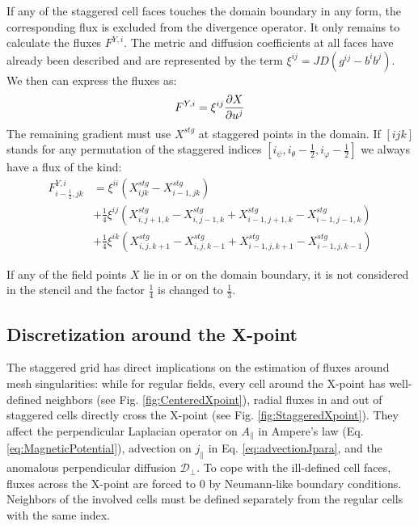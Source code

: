If any of the staggered cell faces touches the domain boundary in any form, the corresponding flux is excluded from the divergence operator. It only remains to calculate the fluxes $F^{Y,i}$. The metric and diffusion coefficients at all faces have already been described and are represented by the term $\xi^{ij}=JD(g^{ij}-b^ib^j)$. We then can express the fluxes as: 
$$ F^{Y,i} = \xi^{ij}\pdv{X}{u^j} $$
The remaining gradient must use $X^{stg}$ at staggered points in the domain. If $[ijk]$ stands for any permutation of the staggered indices $[i_\psi,i_\theta-\frac{1}{2},i_\varphi-\frac{1}{2}]$ we always have a flux of the kind:
\begin{align*}
	F^{Y,i}_{i-\frac{1}{2},jk} &= \xi^{ii}\left(X^{stg}_{ijk}-X^{stg}_{i-1,jk}\right) \\
	&+ \frac{1}{4}\xi^{ij}\left(X^{stg}_{i,j+1,k}-X^{stg}_{i,j-1,k}+X^{stg}_{i-1,j+1,k}-X^{stg}_{i-1,j-1,k}\right) \\
	&+ \frac{1}{4}\xi^{ik}\left(X^{stg}_{i,j,k+1}-X^{stg}_{i,j,k-1}+X^{stg}_{i-1,j,k+1}-X^{stg}_{i-1,j,k-1}\right)
\end{align*}

If any of the field points $X$ lie in or on the domain boundary, it is not considered in the stencil and the factor $\frac{1}{4}$ is changed to $\frac{1}{3}$.

\subsection{Discretization around the X-point}
\label{ssec:DiscretizationXPt}

The staggered grid has direct implications on the estimation of fluxes around mesh singularities: while for regular fields, every cell around the X-point has well-defined neighbors (see Fig. \ref{fig:CenteredXpoint}), radial fluxes in and out of staggered cells directly cross the X-point (see Fig. \ref{fig:StaggeredXpoint}). They affect the perpendicular Laplacian operator on $A_\parallel$ in Ampere's law (Eq. \ref{eq:MagneticPotential}), advection on $j_\parallel$ in Eq. \ref{eq:advectionJpara}, and the anomalous perpendicular diffusion $\mathcal{D}_\perp$. To cope with the ill-defined cell faces, fluxes across the X-point are forced to 0 by Neumann-like boundary conditions. Neighbors of the involved cells must be defined separately from the regular cells with the same index. \newline

